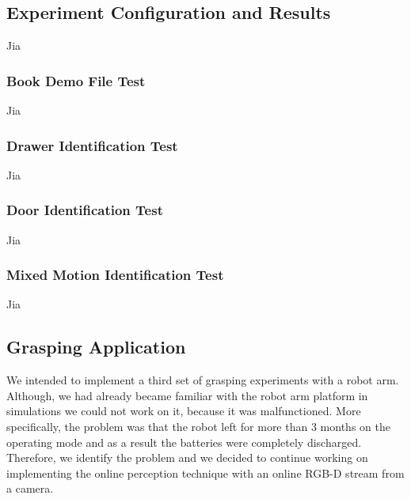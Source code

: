 \documentclass[letterpaper, 10 pt, conference]{ieeeconf}
\begin{document}
\subsection{Experiment Configuration and Results}\label{EV}
Jia

\subsubsection{Book Demo File Test}
Jia


\subsubsection{Drawer Identification Test}
Jia

\subsubsection{Door Identification Test}
Jia

\subsubsection{Mixed Motion Identification Test}
Jia


\subsection{Grasping Application}
We intended to implement a third set of grasping experiments with a robot arm. Although, we had already became familiar with the robot arm platform in simulations we could not work on it, because it was malfunctioned. More specifically, the problem was that the robot left for more than $3$ months on the operating mode and as a result the batteries were completely discharged. Therefore, we identify the problem and we decided to continue working on implementing the online perception technique with an online RGB-D stream from a camera.
\end{document}
